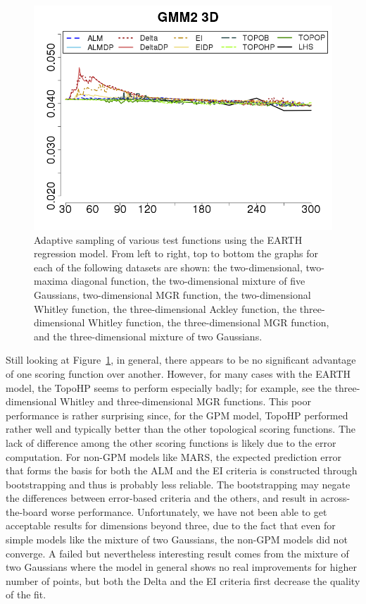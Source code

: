 \begin{figure}[t]
\begin{center}
   \includegraphics[width=0.3\linewidth]{figs/chap5/earth_GMM2_3D_td=30}
   \caption{Adaptive sampling of various test functions using the EARTH regression model.
   From left to right, top to bottom the graphs for each of the following datasets are shown: the two-dimensional, two-maxima diagonal function, the two-dimensional mixture of five Gaussians, two-dimensional MGR function, the two-dimensional Whitley function, the three-dimensional Ackley function, the three-dimensional Whitley function, the three-dimensional MGR function, and the three-dimensional mixture of two Gaussians.}
  \label{fig:earth_results}
  \end{center}
  \end{figure}

Still looking at Figure~\ref{fig:earth_results}, in general, there appears to be no significant advantage of one scoring function over another.
However, for many cases with the EARTH model, the TopoHP seems to perform especially badly; for example, see the three-dimensional Whitley and three-dimensional MGR functions.
%
This poor performance is rather surprising since, for the GPM model, TopoHP performed rather well and typically better than the other topological scoring functions.
%
The lack of difference among the other scoring functions is likely due to the error computation.
%
For non-GPM models like MARS, the expected prediction error that forms the basis for both the ALM and the EI criteria is constructed through bootstrapping and thus is probably less reliable.
%
The bootstrapping may negate the differences between error-based criteria and the others, and result in across-the-board worse performance.
%
Unfortunately, we have not been able to get acceptable results for dimensions beyond three, due to the fact that even for simple models like the mixture of two Gaussians, the non-GPM models did not converge.
%
A failed but nevertheless interesting result comes from the mixture of two Gaussians where the model in general shows no real improvements for higher number of points, but both the Delta and the EI criteria first decrease the quality of the fit.

